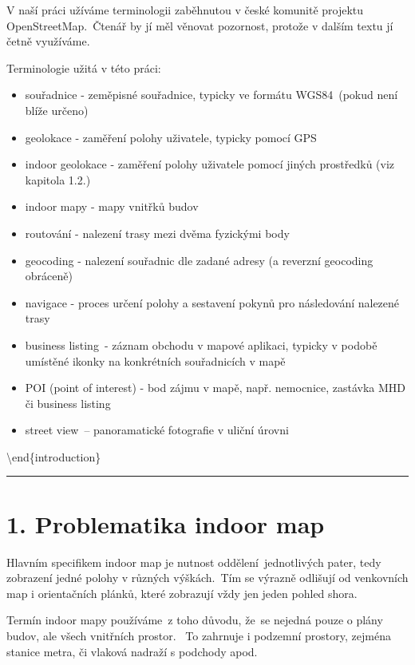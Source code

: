 V naší práci užíváme terminologii zaběhnutou v české komunitě projektu OpenStreetMap.~Čtenář by jí měl věnovat pozornost, protože v dalším textu jí četně využíváme.

Terminologie užitá v této práci:

\begin{itemize}
\tightlist
\item
  souřadnice - zeměpisné souřadnice, typicky ve formátu WGS84~(pokud není blíže určeno)
\item
  geolokace - zaměření polohy uživatele, typicky pomocí GPS
\item
  indoor geolokace - zaměření polohy uživatele pomocí jiných prostředků (viz kapitola 1.2.)
\item
  indoor mapy - mapy vnitřků budov
\item
  routování - nalezení trasy mezi dvěma fyzickými body
\item
  geocoding - nalezení souřadnic dle zadané adresy (a reverzní geocoding obráceně)
\item
  navigace - proces určení polohy a sestavení pokynů pro následování nalezené trasy
\item
  business listing~- záznam obchodu v mapové aplikaci, typicky v podobě umístěné ikonky na konkrétních souřadnicích v mapě
\item
  POI (point of interest) - bod zájmu v mapě, např. nemocnice, zastávka MHD či business listing
\item
  street view~-- panoramatické fotografie v uliční úrovni
\end{itemize}

\textbackslash{}end\{introduction\}

\begin{center}\rule{0.5\linewidth}{\linethickness}\end{center}

\chapter{1. Problematika indoor map}\label{problematika-indoor-map}

Hlavním specifikem indoor map je nutnost oddělení~jednotlivých pater, tedy zobrazení jedné polohy v různých výškách.~Tím se výrazně odlišují od venkovních map i orientačních plánků, které zobrazují vždy jen jeden pohled shora.

Termín indoor mapy používáme~z toho důvodu, že~se nejedná pouze o plány budov, ale všech vnitřních prostor. ~To zahrnuje i podzemní prostory, zejména stanice metra, či vlaková nadraží s podchody apod.

